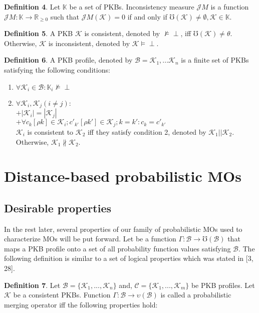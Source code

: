 \documentclass[]{iosart2c}
\begin{document}
\textbf{Definition 4}. Let $\mathbb{K}$ be a set of PKBs. Inconsistency measure $\mathcal{J}M$ is a function $\mathcal{J}M: \mathbb{K} \to \mathbb {R}_{\geq 0}$ such that $\mathcal{J}M(\mathcal{K}) = 0$ if and only if $\mho (\mathcal{K}) \neq \emptyset, \mathcal{K} \in \mathbb{K}$.

\textbf{Definition 5}. A PKB $\mathcal{K}$ is consistent, denoted by $\nvDash \perp$, iff $\mho (\mathcal{K}) \neq \theta$. Otherwise, $\mathcal{K}$ is inconsistent, denoted by $\mathcal{K} \models \perp$.

\textbf{Definition 6}. A PKB profile, denoted by $\mathcal{B} = {\mathcal{K}_1, ...\mathcal{K}_n}$ is a finite set of PKBs satisfying the following conditions: 

\begin{enumerate}

\item $\forall \mathcal{K}_i \in \mathcal{B} : \mathbb{K}_i \nvDash \perp$
\item $\forall \mathcal{K}_i,\mathcal{K}_j (i \neq j) :$\\
	$+|\mathcal{K}_i| = |\mathcal{K}_j|$ \\
	$+\forall c_k[\rho k] \in \mathcal{K}_i; c'_{k'} [\rho k'] \in \mathcal{K}_j; k = k' : c_k = c'_{k'}$\\
$\mathcal{K}_i$ is consistent to $\mathcal{K}_2$ iff they satisfy condition 2, denoted by $\mathcal{K}_1||\mathcal{K}_2$. Otherwise, $\mathcal{K}_1 \nparallel \mathcal{K}_2$.

\end{enumerate}

\section{Distance-based probabilistic MOs}

\subsection{Desirable properties}

In the rest later, several properties of our family of probabilistic MOs used to characterize MOs will be put forward. Let be a function $\Gamma: \mathcal{B} \to \mho(\mathcal{B})$ that maps a PKB profile onto a set of all probability function values satisfying $\mathcal{B}$. The following definition is similar to a set of logical properties which was stated in [3, 28].

\textbf{Definition 7}. Let $\mathcal{B} = \{\mathcal{K}_1 , ... ,\mathcal{K}_n\}$ and, $\mathcal{C} = \{\mathcal{K}_1, ... ,\mathcal{K}_m\}$ be PKB profiles. Let $\mathcal{K}$ be a consistent PKBs. Function $\Gamma: \mathcal{B} \to \upsilon(\mathcal{B})$ is called a probabilistic merging operator iff the following properties hold:
\end{document}
